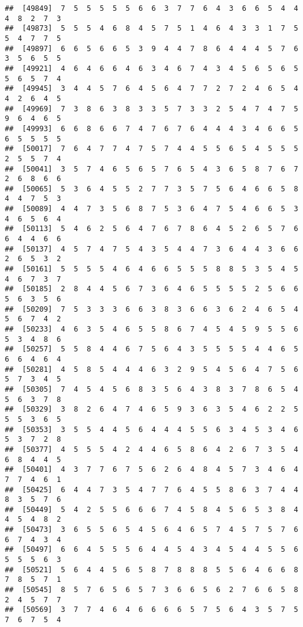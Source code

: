 \documentclass[
]{book}
\begin{document}
\begin{verbatim}
##  [49849]  7  5  5  5  5  5  6  6  3  7  7  6  4  3  6  6  5  4  4  4  8  2  7  3
##  [49873]  5  5  5  4  6  8  4  5  7  5  1  4  6  4  3  3  1  7  5  5  4  7  7  5
##  [49897]  6  6  5  6  6  5  3  9  4  4  7  8  6  4  4  4  5  7  6  3  5  6  5  5
##  [49921]  4  6  4  6  6  4  6  3  4  6  7  4  3  4  5  6  5  6  5  5  6  5  7  4
##  [49945]  3  4  4  5  7  6  4  5  6  4  7  7  2  7  2  4  6  5  4  4  2  6  4  5
##  [49969]  7  3  8  6  3  8  3  3  5  7  3  3  2  5  4  7  4  7  5  9  6  4  6  5
##  [49993]  6  6  8  6  6  7  4  7  6  7  6  4  4  4  3  4  6  6  5  6  5  5  5  5
##  [50017]  7  6  4  7  7  4  7  5  7  4  4  5  5  6  5  4  5  5  5  2  5  5  7  4
##  [50041]  3  5  7  4  6  5  6  5  7  6  5  4  3  6  5  8  7  6  7  2  6  8  6  6
##  [50065]  5  3  6  4  5  5  2  7  7  3  5  7  5  6  4  6  6  5  8  4  4  7  5  3
##  [50089]  4  4  7  3  5  6  8  7  5  3  6  4  7  5  4  6  6  5  3  4  6  5  6  4
##  [50113]  5  4  6  2  5  6  4  7  6  7  8  6  4  5  2  6  5  7  6  6  4  4  6  6
##  [50137]  4  5  7  4  7  5  4  3  5  4  4  7  3  6  4  4  3  6  6  2  6  5  3  2
##  [50161]  5  5  5  5  4  6  4  6  6  5  5  5  8  8  5  3  5  4  5  4  6  7  3  7
##  [50185]  2  8  4  4  5  6  7  3  6  4  6  5  5  5  5  2  5  6  6  5  6  3  5  6
##  [50209]  7  5  3  3  3  6  6  3  8  3  6  6  3  6  2  4  6  5  4  5  6  7  4  2
##  [50233]  4  6  3  5  4  6  5  5  8  6  7  4  5  4  5  9  5  5  6  5  3  4  8  6
##  [50257]  5  5  8  4  4  6  7  5  6  4  3  5  5  5  5  4  4  6  5  6  6  4  6  4
##  [50281]  4  5  8  5  4  4  4  6  3  2  9  5  4  5  6  4  7  5  6  5  7  3  4  5
##  [50305]  7  4  5  4  5  6  8  3  5  6  4  3  8  3  7  8  6  5  4  5  6  3  7  8
##  [50329]  3  8  2  6  4  7  4  6  5  9  3  6  3  5  4  6  2  2  5  5  5  3  6  5
##  [50353]  3  5  5  4  4  5  6  4  4  4  5  5  6  3  4  5  3  4  6  5  3  7  2  8
##  [50377]  4  5  5  5  4  2  4  4  6  5  8  6  4  2  6  7  3  5  4  6  8  4  4  5
##  [50401]  4  3  7  7  6  7  5  6  2  6  4  8  4  5  7  3  4  6  4  7  7  4  6  1
##  [50425]  6  4  4  7  3  5  4  7  7  6  4  5  5  8  6  3  7  4  4  8  3  5  7  6
##  [50449]  5  4  2  5  5  6  6  6  7  4  5  8  4  5  6  5  3  8  4  4  5  4  8  2
##  [50473]  3  6  5  5  6  5  4  5  6  4  6  5  7  4  5  7  5  7  6  6  7  4  3  4
##  [50497]  6  6  4  5  5  5  6  4  4  5  4  3  4  5  4  4  5  5  6  5  5  5  6  3
##  [50521]  5  6  4  4  5  6  5  8  7  8  8  8  5  5  6  4  6  6  8  7  8  5  7  1
##  [50545]  8  5  7  6  5  6  5  7  3  6  6  5  6  2  7  6  6  5  8  2  4  5  7  7
##  [50569]  3  7  7  4  6  4  6  6  6  6  5  7  5  6  4  3  5  7  5  7  6  7  5  4

\end{verbatim}
\end{document}
